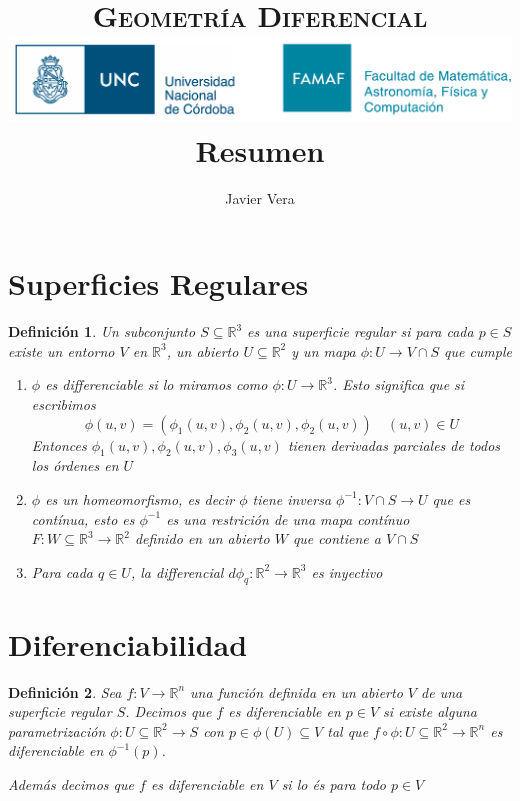 \documentclass[12pt]{book}
\theoremstyle{break}
\newtheorem{definition}{Definición}[section]
\begin{document}

\title{\textsc{\footnotesize Geometría Diferencial} \hfill
\includegraphics[scale=0.15]{logo_UNC-FAMAF.png} \\ 
Resumen}
\author{Javier Vera}
\maketitle
\newpage

\section{Superficies Regulares}

\begin{definition}
  Un subconjunto $S \subseteq \mathbb{R}^3 $ es una superficie regular si para cada $p \in S$ existe un entorno
  $V$ en $\mathbb{R}^3 $, un abierto $U \subseteq \mathbb{R}^2 $ y un mapa $\phi:U\rightarrow V\cap S$ que cumple
  \begin{enumerate}
      \item $\phi$ es differenciable si lo miramos como $\phi:U\rightarrow \mathbb{R}^3 $. 
      Esto significa que si escribimos
      $$ \phi(u,v) = (\phi_1(u,v),\phi_2(u,v),\phi_2(u,v)) \quad (u,v) \in U$$
      Entonces $\phi_1(u,v),\phi_2(u,v),\phi_3(u,v)$ tienen derivadas parciales de todos los órdenes
      en $U$
      \item $\phi$ es un homeomorfismo, es decir $\phi$ tiene inversa $\phi^{-1}:V\cap S \rightarrow U$
      que es contínua, esto es $\phi^{-1}$ es una restrición de una mapa contínuo 
      $F:W \subseteq \mathbb{R}^3 \rightarrow \mathbb{R}^2$ definido en un abierto $W$ que contiene a $V\cap S$
      \item Para cada $q\in U$, la differencial $d\phi_q:\mathbb{R}^2 \rightarrow \mathbb{R}^3$ es inyectivo
  \end{enumerate}
\end{definition}

\section{Diferenciabilidad}
\begin{definition}
    Sea $f:V\rightarrow \mathbb{R}^n$ una función definida en un abierto $V$ de una superficie regular $S$.
    Decimos que $f$ es diferenciable en $p\in V$ si existe alguna parametrización 
    $\phi:U \subseteq \mathbb{R}^2 \rightarrow S$ con 
    $p\in \phi(U) \subseteq V$ tal que $f\circ \phi:U \subseteq \mathbb{R}^2 \rightarrow \mathbb{R}^n$ es
    diferenciable en $\phi^{-1}(p)$. 
    
    Además decimos que $f$ es diferenciable en $V$ si lo és para todo $p \in V$
\end{definition}
\end{document}
